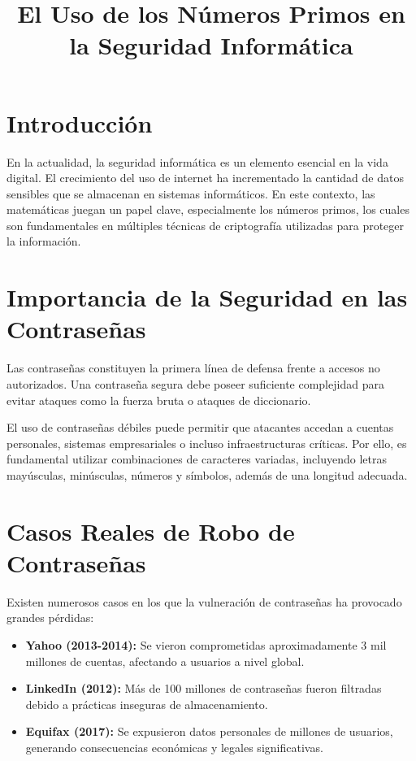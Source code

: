 \documentclass[12pt]{article}
\title{El Uso de los Números Primos en la Seguridad Informática}
\author{}
\date{}
\begin{document}
\maketitle

\section{Introducción}

En la actualidad, la seguridad informática es un elemento esencial en la vida digital. El crecimiento del uso de internet ha incrementado la cantidad de datos sensibles que se almacenan en sistemas informáticos. En este contexto, las matemáticas juegan un papel clave, especialmente los números primos, los cuales son fundamentales en múltiples técnicas de criptografía utilizadas para proteger la información.

\section{Importancia de la Seguridad en las Contraseñas}

Las contraseñas constituyen la primera línea de defensa frente a accesos no autorizados. Una contraseña segura debe poseer suficiente complejidad para evitar ataques como la fuerza bruta o ataques de diccionario.

El uso de contraseñas débiles puede permitir que atacantes accedan a cuentas personales, sistemas empresariales o incluso infraestructuras críticas. Por ello, es fundamental utilizar combinaciones de caracteres variadas, incluyendo letras mayúsculas, minúsculas, números y símbolos, además de una longitud adecuada.

\section{Casos Reales de Robo de Contraseñas}

Existen numerosos casos en los que la vulneración de contraseñas ha provocado grandes pérdidas:

\begin{itemize}
\item \textbf{Yahoo (2013-2014):} Se vieron comprometidas aproximadamente 3 mil millones de cuentas, afectando a usuarios a nivel global.
\item \textbf{LinkedIn (2012):} Más de 100 millones de contraseñas fueron filtradas debido a prácticas inseguras de almacenamiento.
\item \textbf{Equifax (2017):} Se expusieron datos personales de millones de usuarios, generando consecuencias económicas y legales significativas.
\end{itemize}
\end{document}
